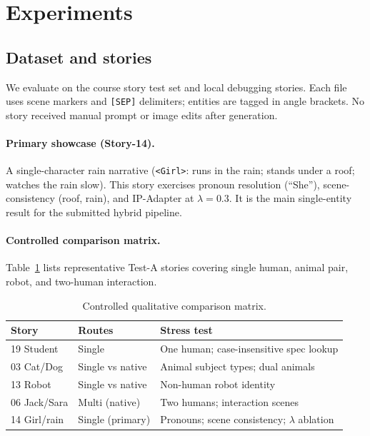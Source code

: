 \section{Experiments}
\label{sec:exp}

\subsection{Dataset and stories}
We evaluate on the course story test set and local debugging stories.
Each file uses scene markers and \texttt{[SEP]} delimiters; entities are tagged in angle brackets.
No story received manual prompt or image edits after generation.

\paragraph{Primary showcase (Story-14).}
A single-character rain narrative (\texttt{<Girl>}: runs in the rain; stands under a roof; watches the rain slow).
This story exercises pronoun resolution (``She''), scene-consistency (roof, rain), and IP-Adapter at $\lambda=0.3$.
It is the main single-entity result for the submitted hybrid pipeline.

\paragraph{Controlled comparison matrix.}
Table~\ref{tab:controlled_comparisons} lists representative Test-A stories covering single human, animal pair, robot, and two-human interaction.

\begin{table}[!t]
  \centering
  \small
  \caption{Controlled qualitative comparison matrix.}
  \label{tab:controlled_comparisons}
  \begin{tabular}{p{}p{}p{}}
    \toprule
    \textbf{Story} & \textbf{Routes} & \textbf{Stress test} \\
    \midrule
    19 Student & Single & One human; case-insensitive spec lookup \\
    03 Cat/Dog & Single vs native & Animal subject types; dual animals \\
    13 Robot & Single vs native & Non-human robot identity \\
    06 Jack/Sara & Multi (native) & Two humans; interaction scenes \\
    14 Girl/rain & Single (primary) & Pronouns; scene consistency; $\lambda$ ablation \\
  \end{tabular}
\end{table}

